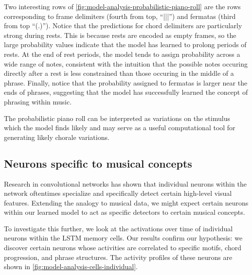 Two interesting rows of \cref{fig:model-analysis-probabilistic-piano-roll}
are the rows corresponding to frame delimiters (fourth from top, ``|||'') and
fermatas (third from top ``(.)''). Notice that the predictions for chord
delimiters are particularly strong during rests. This is because rests are
encoded as empty frames, so the large probability values indicate that the
model has learned to prolong periods of rests. At the end of rest periods, the
model tends to assign probability across a wide range of notes, consistent with
the intuition that the possible notes occuring directly after a rest is less
constrained than  those occuring in the middle of a
phrase. Finally, notice that the probability assigned to fermatas is larger
near the ends of phrases, suggesting that the model has successfully learned
the concept of phrasing within music.

The probabilistic piano roll can be interpreted as variations on the stimulus
which the model finds likely and may serve as a useful computational tool for
generating likely chorale variations.

\subsection{Neurons specific to musical concepts}\label{sec:music-concept-neurons}

Research in convolutional networks has shown that individual neurons within the
network oftentimes specialize and specifically detect certain high-level visual
features. Extending the analogy to musical data, we
might expect certain neurons within our learned model to act as specific
detectors to certain musical concepts.

To investigate this further, we look at the activations over time of individual
neurons within the LSTM memory cells. Our results confirm our hypothesis: we
discover certain neurons whose activities are correlated to specific motifs,
chord progression, and phrase structures. The activity profiles of these
neurons are shown in \cref{fig:model-analysis-cells-individual}.

